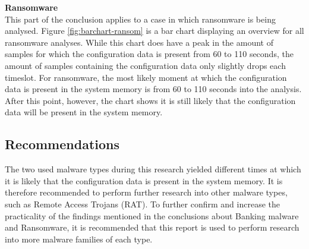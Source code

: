 \documentclass[conference]{IEEEtran}
\begin{document}
\textbf{Ransomware}\\
This part of the conclusion applies to a case in which ransomware is being analysed. Figure \ref{fig:barchart-ransom} is a bar chart displaying an overview for all ransomware analyses. While this chart does have a peak in the amount of samples for which the configuration data is present from 60 to 110 seconds, the amount of samples containing the configuration data only slightly drops each timeslot. For ransomware, the most likely moment at which the configuration data is present in the system memory is from 60 to 110 seconds into the analysis. After this point, however, the chart shows it is still likely that the configuration data will be present in the system memory.


\subsection{Recommendations}
The two used malware types during this research yielded different times at which it is likely that the configuration data is present in the system memory. It is therefore recommended to perform further research into other malware types, such as Remote Access Trojans (RAT). To further confirm and increase the practicality of the findings mentioned in the conclusions about Banking malware and Ransomware, it is recommended that this report is used to perform research into more malware families of each type.
\end{document}
